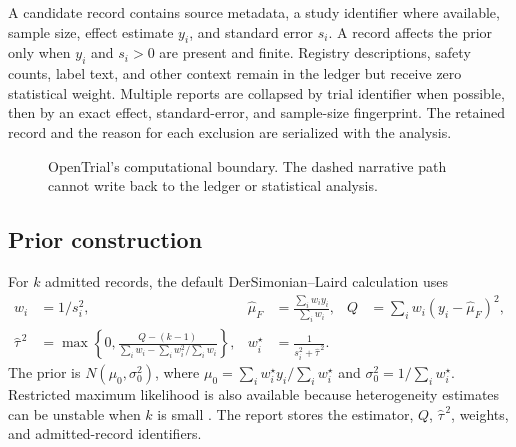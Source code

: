 \documentclass{article}
\begin{document}
A candidate record contains source metadata, a study identifier where available, sample size, effect estimate \(y_i\), and standard error \(s_i\). A record affects the prior only when \(y_i\) and \(s_i>0\) are present and finite. Registry descriptions, safety counts, label text, and other context remain in the ledger but receive zero statistical weight. Multiple reports are collapsed by trial identifier when possible, then by an exact effect, standard-error, and sample-size fingerprint. The retained record and the reason for each exclusion are serialized with the analysis.

\begin{figure}[ht]
\centering
{}
\caption{OpenTrial's computational boundary. The dashed narrative path cannot write back to the ledger or statistical analysis.}
\label{fig:architecture}
\end{figure}

\subsection{Prior construction}

For \(k\) admitted records, the default DerSimonian--Laird calculation uses
\begin{align*}
w_i&=1/s_i^2, & \widehat{\mu}_{F}&=\frac{\sum_i w_i y_i}{\sum_i w_i},
& Q&=\sum_i w_i(y_i-\widehat{\mu}_{F})^2,\\
\widehat{\tau}^{\,2}&=\max\left\{0,\frac{Q-(k-1)}
{\sum_i w_i-\sum_i w_i^2/\sum_i w_i}\right\},
& w_i^\star&=\frac{1}{s_i^2+\widehat{\tau}^{\,2}}.
\end{align*}
The prior is \(N(\mu_0,\sigma_0^2)\), where \(\mu_0=\sum_iw_i^\star y_i/\sum_iw_i^\star\) and \(\sigma_0^2=1/\sum_iw_i^\star\). Restricted maximum likelihood is also available because heterogeneity estimates can be unstable when \(k\) is small \citep{viechtbauer2005}. The report stores the estimator, \(Q\), \(\widehat{\tau}^{\,2}\), weights, and admitted-record identifiers.
\end{document}
